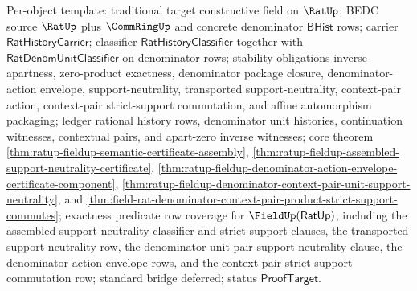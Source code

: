 Per-object template: traditional target constructive field on $\RatUp$; BEDC
source $\RatUp$ plus $\CommRingUp$ and concrete denominator $\mathsf{BHist}$
rows; carrier $\mathsf{RatHistoryCarrier}$; classifier
$\mathsf{RatHistoryClassifier}$ together with
$\mathsf{RatDenomUnitClassifier}$ on denominator rows; stability obligations
inverse apartness, zero-product exactness, denominator package closure,
denominator-action envelope, support-neutrality, transported support-neutrality,
context-pair action, context-pair strict-support commutation, and affine
automorphism packaging;
ledger rational history rows, denominator unit histories, continuation
witnesses, contextual pairs, and apart-zero inverse witnesses; core theorem
\autoref{thm:ratup-fieldup-semantic-certificate-assembly},
\autoref{thm:ratup-fieldup-assembled-support-neutrality-certificate},
\autoref{thm:ratup-fieldup-denominator-action-envelope-certificate-component},
\autoref{thm:ratup-fieldup-denominator-context-pair-unit-support-neutrality},
and
\autoref{thm:field-rat-denominator-context-pair-product-strict-support-commutes};
exactness predicate row coverage for $\FieldUp(\mathsf{RatUp})$, including the
assembled support-neutrality classifier and strict-support clauses, the
transported support-neutrality row, the denominator unit-pair
support-neutrality clause, the denominator-action envelope rows, and the
context-pair strict-support commutation row; standard bridge deferred; status
$\mathsf{ProofTarget}$.
